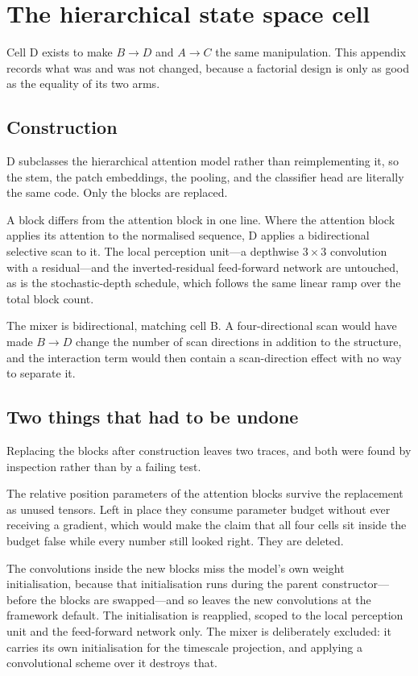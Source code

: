 \section{The hierarchical state space cell}
\label{app:hvim}

Cell D exists to make $B \to D$ and $A \to C$ the same manipulation. This
appendix records what was and was not changed, because a factorial design is
only as good as the equality of its two arms.

\subsection{Construction}

D subclasses the hierarchical attention model rather than reimplementing it,
so the stem, the patch embeddings, the pooling, and the classifier head are
literally the same code. Only the blocks are replaced.

A block differs from the attention block in one line. Where the attention
block applies its attention to the normalised sequence, D applies a
bidirectional selective scan to it. The local perception unit---a depthwise
$3\times3$ convolution with a residual---and the inverted-residual
feed-forward network are untouched, as is the stochastic-depth schedule,
which follows the same linear ramp over the total block count.

The mixer is bidirectional, matching cell B. A four-directional scan would
have made $B \to D$ change the number of scan directions in addition to the
structure, and the interaction term would then contain a scan-direction
effect with no way to separate it.

\subsection{Two things that had to be undone}

Replacing the blocks after construction leaves two traces, and both were
found by inspection rather than by a failing test.

The relative position parameters of the attention blocks survive the
replacement as unused tensors. Left in place they consume parameter budget
without ever receiving a gradient, which would make the claim that all four
cells sit inside the budget false while every number still looked right.
They are deleted.

The convolutions inside the new blocks miss the model's own weight
initialisation, because that initialisation runs during the parent
constructor---before the blocks are swapped---and so leaves the new
convolutions at the framework default. The initialisation is reapplied,
scoped to the local perception unit and the feed-forward network only. The
mixer is deliberately excluded: it carries its own initialisation for the
timescale projection, and applying a convolutional scheme over it destroys
that.

